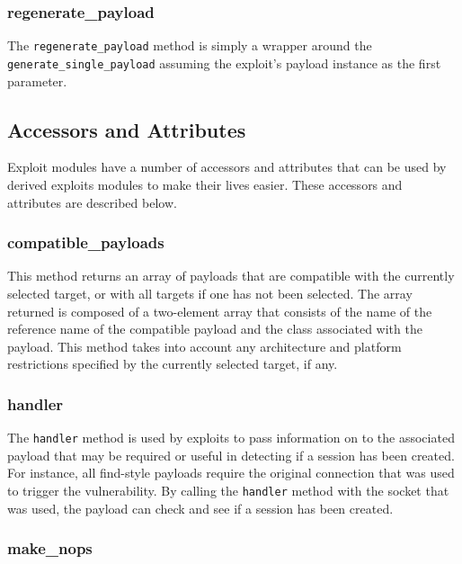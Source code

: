 \documentclass{report}
\begin{document}
            \subsubsection{regenerate\_payload}

\par
The \texttt{regenerate\_payload} method is simply a wrapper around
the \texttt{generate\_single\_payload} assuming the exploit's
payload instance as the first parameter.

        \subsection{Accessors and Attributes}

\par
Exploit modules have a number of accessors and attributes that can
be used by derived exploits modules to make their lives easier.
These accessors and attributes are described below.

            \subsubsection{compatible\_payloads}

\par
This method returns an array of payloads that are compatible with
the currently selected target, or with all targets if one has not
been selected.  The array returned is composed of a two-element
array that consists of the name of the reference name of the
compatible payload and the class associated with the payload.  This
method takes into account any architecture and platform restrictions
specified by the currently selected target, if any.

            \subsubsection{handler}

\par
The \texttt{handler} method is used by exploits to pass information
on to the associated payload that may be required or useful in
detecting if a session has been created.  For instance, all
find-style payloads require the original connection that was used to
trigger the vulnerability.  By calling the \texttt{handler} method
with the socket that was used, the payload can check and see if a
session has been created.

            \subsubsection{make\_nops}
\end{document}
